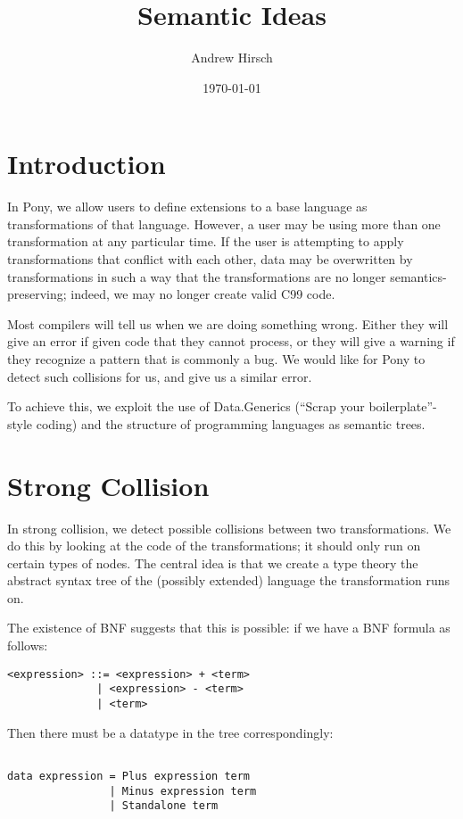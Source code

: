\documentclass[11pt]{article}
\title{Semantic Ideas}
\author{Andrew Hirsch}
\date{\today}
\begin{document}
\maketitle


\section{Introduction}
\label{sec-1}


In Pony, we allow users to define extensions to a base language as transformations of that language. However, a user may be using more than one transformation at any particular time. If the user is attempting to apply transformations that conflict with each other, data may be overwritten by transformations in such a way that the transformations are no longer semantics-preserving; indeed, we may no longer create valid C99 code.

Most compilers will tell us when we are doing something wrong. Either they will give an error if given code that they cannot process, or they will give a warning if they recognize a pattern that is commonly a bug. We would like for Pony to detect such collisions for us, and give us a similar error.

To achieve this, we exploit the use of Data.Generics (``Scrap your boilerplate''-style coding) and the structure of programming languages as semantic trees.
\section{Strong Collision}
\label{sec-2}


In strong collision, we detect possible collisions between two transformations. We do this by looking at the code of the transformations; it should only run on certain types of nodes. The central idea is that we create a type theory the abstract syntax tree of the (possibly extended) language the transformation runs on.

The existence of BNF suggests that this is possible: if we have a BNF formula as follows:

\begin{verbatim}
<expression> ::= <expression> + <term>
              | <expression> - <term>
              | <term>                
\end{verbatim}

Then there must be a datatype in the tree correspondingly:

\begin{lstlisting}

data expression = Plus expression term
                | Minus expression term 
                | Standalone term

\end{lstlisting}
\end{document}
